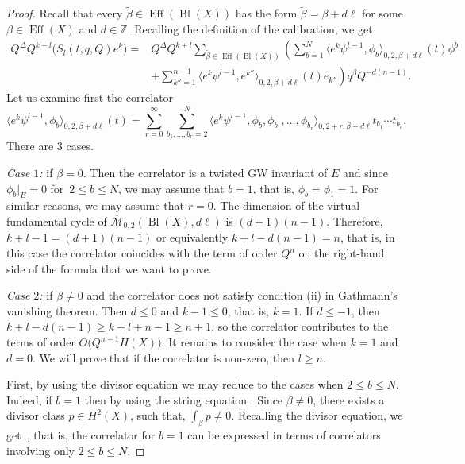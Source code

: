 \documentclass[pdftex]{sigma}
\numberwithin{equation}{section}
\newcommand{\ZZ}{\mathbb{Z}}
\begin{document}
\begin{proof}
Recall that every $\widetilde{\beta}\in \operatorname{Eff}(\operatorname{Bl}(X))$
has the form $\widetilde{\beta}=\beta + d\ell$ for some
$\beta \in \operatorname{Eff}(X)$ and $d\in \ZZ$. Recalling the
definition of the calibration, we get
\begin{align*}
Q^\Delta Q^{k+l} \big(S_l(t,q,Q) e^k\big) ={}&
Q^\Delta Q^{k+l}
\sum_{\widetilde{\beta}\in
\operatorname{Eff}(\operatorname{Bl}(X)) }
\left(
\sum_{b=1}^N
\big\langle e^k \psi^{l-1},\phi_b\big\rangle_{0,2,\beta+d\ell}(t)
\phi^b\right.\\
&\left. +
\sum_{k''=1}^{n-1}
\big\langle e^k \psi^{l-1}, e^{k''}\big\rangle_{0,2,\beta+d\ell}(t)
e_{k''} \right) q^\beta Q^{-d (n-1)}.
\end{align*}
Let us examine first the correlator
\[
\big\langle e^k \psi^{l-1},\phi_b\big\rangle_{0,2,\beta+d\ell}(t) =
\sum_{r=0}^\infty \sum_{b_1,\dots,b_r=2}^N
\big\langle e^k \psi^{l-1},\phi_b,\phi_{b_1},\dots,\phi_{b_r}
\big\rangle_{0,2+r,\beta+d\ell}
t_{b_1}\cdots t_{b_r}.
\]
There are 3 cases.

{\em Case $1$:} if $\beta=0$. Then the correlator is a twisted GW
invariant of $E$ and since $\phi_b|_E=0$ for~$2\leq b\leq N$, we may
assume that $b=1$, that is, $\phi_b=\phi_1=1$. For similar reasons, we
may assume that $r=0$. The dimension of the
virtual fundamental cycle of
$\overline{\mathcal{M}}_{0,2}(\operatorname{Bl}(X),d\ell)$ is
$(d+1)(n-1)$. Therefore, $k+l-1=(d+1)(n-1)$ or equivalently
$k+l-d(n-1)=n$, that is, in this case the correlator coincides with
the term of order $Q^n$ on the right-hand side of the formula that we want to prove.

{\em Case $2$:} if $\beta\neq 0$ and the correlator does not satisfy
condition (ii) in Gathmann's vanishing theorem. Then $d\leq 0$ and
$k-1\leq 0$, that is, $k=1$. If $d\leq -1$, then
$k+l-d(n-1)\geq k+l+n-1\geq n+1$, so the correlator contributes to the
terms of order $O\big(Q^{n+1}H(X)\big)$. It remains to consider the case when $k=1$ and $d=0$. We will prove that if the correlator  is non-zero, then $l\geq n$.

First, by using the divisor equation we may reduce to the cases when $2\leq b\leq N$. Indeed, if $b=1$ then by using the string equation
. Since $\beta\neq 0$, there exists a divisor class $p\in H^2(X)$, such that, $\int_\beta p\neq 0$. Recalling the divisor equation, we get~, that is, the correlator for $b=1$ can be expressed in terms of correlators involving only $2\leq b\leq N$.


\end{proof}
\end{document}
